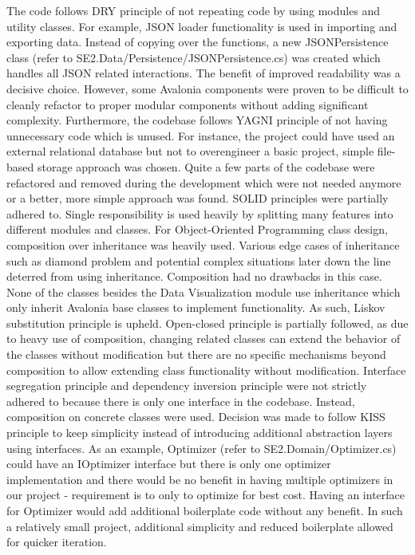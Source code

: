 The code follows DRY principle of not repeating code by using modules and utility classes. For example, JSON loader functionality is used in importing and exporting data. Instead of copying over the functions, a new JSONPersistence class (refer to SE2.Data/Persistence/JSONPersistence.cs) was created which handles all JSON related interactions. The benefit of improved readability was a decisive choice. However, some Avalonia components were proven to be difficult to cleanly refactor to proper modular components without adding significant complexity. Furthermore, the codebase follows YAGNI principle of not having unnecessary code which is unused. For instance, the project could have used an external relational database but not to overengineer a basic project, simple file-based storage approach was chosen. Quite a few parts of the codebase were refactored and removed during the development which were not needed anymore or a better, more simple approach was found. SOLID principles were partially adhered to. Single responsibility is used heavily by splitting many features into different modules and classes. For Object-Oriented Programming class design, composition over inheritance was heavily used. Various edge cases of inheritance such as diamond problem and potential complex situations later down the line deterred from using inheritance. Composition had no drawbacks in this case. None of the classes besides the Data Visualization module use inheritance which only inherit Avalonia base classes to implement functionality. As such, Liskov substitution principle is upheld. Open-closed principle is partially followed, as due to heavy use of composition, changing related classes can extend the behavior of the classes without modification but there are no specific mechanisms beyond composition to allow extending class functionality without modification. Interface segregation principle and dependency inversion principle were not strictly adhered to because there is only one interface in the codebase. Instead, composition on concrete classes were used. Decision was made to follow KISS principle to keep simplicity instead of introducing additional abstraction layers using interfaces. As an example, Optimizer (refer to SE2.Domain/Optimizer.cs) could have an IOptimizer interface but there is only one optimizer implementation and there would be no benefit in having multiple optimizers in our project - requirement is to only to optimize for best cost. Having an interface for Optimizer would add additional boilerplate code without any benefit. In such a relatively small project, additional simplicity and reduced boilerplate allowed for quicker iteration.

  
